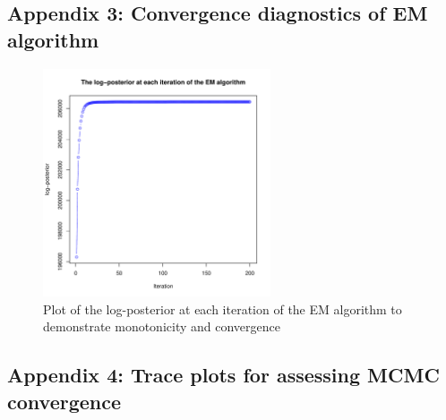 \documentclass[12pt,english]{article}\usepackage[]{graphicx}\usepackage[]{color}
\newenvironment{knitrout}{}{} %
\begin{document}
\clearpage

\subsection{Appendix 3: Convergence diagnostics of EM algorithm} \label{app:logposterior}

\begin{figure}[h]
  \centering
\begin{knitrout}
\color{fgcolor}
\includegraphics[width=0.6\textwidth]{figure/emconverge-1} 

\end{knitrout}

\caption{Plot of the log-posterior at each iteration of the EM
  algorithm to demonstrate monotonicity and convergence}
  \label{figure::emconvergence}
\end{figure}

\clearpage

\subsection{Appendix 4: Trace plots for assessing MCMC convergence}\label{app:mcmc}
\end{document}
